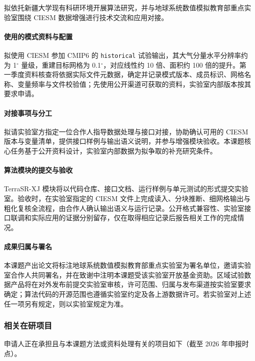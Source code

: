 拟依托新疆大学现有科研环境开展算法研究，并与地球系统数值模拟教育部重点实验室围绕 CIESM 数据增强进行技术交流和应用对接。

\paragraph{使用的模式资料与配置}
拟使用 CIESM 参加 CMIP6 的 \texttt{historical} 试验输出，其大气分量水平分辨率约为 1$^{\circ}$ 量级，重建目标网格为 0.1$^{\circ}$，对应线性约 10 倍、面积约 100 倍的提升。第一季度资料核查将依据实际文件元数据，确定并记录模式版本、成员标识、网格名称、变量频率与文件校验值；先使用公开渠道可获取的资料，实验室内部版本按其要求申请。

\paragraph{对接事项与分工}
拟请实验室方指定一位合作人指导数据处理与接口对接，协助确认可用的 CIESM 版本与变量清单，提供接口样例与输出语义说明，并参与增强模块验收。本课题核心任务基于公开资料设计，实验室内部数据为拟争取的补充研究条件。

\paragraph{算法模块的提交与验收}
TerraSR-XJ 模块将以代码仓库、接口文档、运行样例与单元测试的形式提交实验室。验收时，在实验室指定的 CIESM 文件上完成读入、分块推断、细网格输出与粗化复核全流程，由合作人确认输出语义与运行记录。公开格式兼容性、实验室接口联调和实际应用的证据分别留存，仅在取得相应记录后报告相关工作的完成情况。

\paragraph{成果归属与署名}
本课题产出论文将标注地球系统数值模拟教育部重点实验室为署名单位，邀请实验室合作人共同署名，并在致谢中注明本课题受该实验室开放基金资助。区域试验数据产品将在对外发布前提交实验室审核，许可范围、归属与发布渠道按实验室要求确定；算法代码的开源范围也遵循实验室约定及各上游数据许可。若实验室对上述任一项另有规定，则以实验室规定为准。

\subsubsection{相关在研项目}

申请人正在承担且与本课题方法或资料处理有关的项目如下（截至 2026 年申报时点）。

